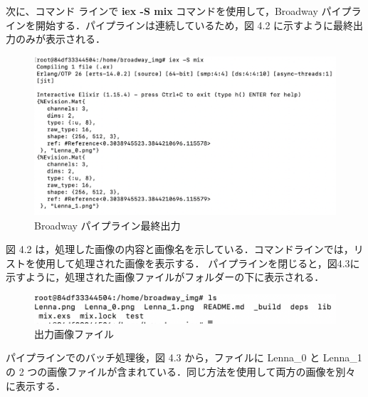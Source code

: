 \documentclass[a4paper]{jreport}	%
\begin{document}
次に、コマンド ラインで \textbf{iex -S mix} コマンドを使用して，Broadway パイプラインを開始する．パイプラインは連続しているため，図 4.2 に示すように最終出力のみが表示される．

\begin{figure}[H]
\vspace{5cm}
\begin{center}
\hspace{-8cm}
\includegraphics[scale=0.5]{ja/f9.png}
\end{center}
\caption{Broadway パイプライン最終出力}
\end{figure}

図 4.2 は，処理した画像の内容と画像名を示している．コマンドラインでは，リストを使用して処理された画像を表示する．
パイプラインを閉じると，図4.3に示すように，処理された画像ファイルがフォルダーの下に表示される．

\begin{figure}[H]
\begin{center}
\hspace{-8cm}
\includegraphics[scale=0.5]{ja/f8.png}
\end{center}
\caption{出力画像ファイル}
\end{figure}

パイプラインでのバッチ処理後，図 4.3 から，ファイルに Lenna\_0 と Lenna\_1 の 2 つの画像ファイルが含まれている．同じ方法を使用して両方の画像を別々に表示する．
\end{document}
